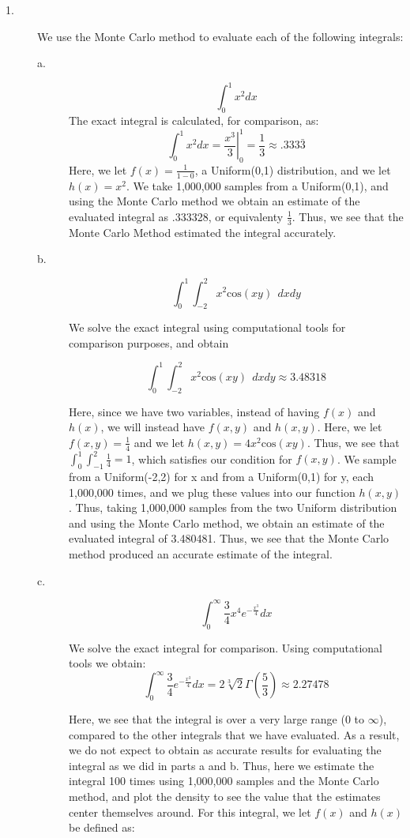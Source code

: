 \documentclass[12pt]{article}
\renewcommand{\title}[1]{\textbf{#1}\\}
\begin{document}
\center{\title{STAT 243 HW\#4}}

\begin{description}


\item[1.] We use the Monte Carlo method to evaluate each of the following integrals:
\begin{description}
\item[a.] \[\int_0^1 x^2 dx\]
The exact integral is calculated, for comparison, as:
\[\int_0^1 x^2 dx = \left. \frac{x^3}{3} \right|_0^1 = \frac{1}{3} \approx .333\bar{3} \]
Here, we let $f(x) = \frac{1}{1-0}$, a Uniform(0,1) distribution, and we let $h(x) = x^2$. We take 1,000,000 samples from a Uniform(0,1), and using the Monte Carlo method we obtain an estimate of the evaluated integral as .333328, or equivalenty $\frac{1}{3}$. Thus, we see that the Monte Carlo Method estimated the integral accurately. 

\item[b.] \[\int_0^1 \int^2_{-2} x^2 \mathrm{cos}(xy) \ \ dx dy\]

We solve the exact integral using computational tools for comparison purposes, and obtain

\[\int_0^1 \int^2_{-2} x^2 \mathrm{cos}(xy) \ \ dx dy \approx 3.48318\]

Here, since we have two variables, instead of having $f(x)$ and $h(x)$, we will instead have $f(x,y)$ and $h(x,y)$. Here, we let $f(x,y) = \frac{1}{4}$ and we let $h(x,y) = 4x^2\mathrm{cos}(xy)$. Thus, we see that $\int_0^1 \int_{-1}^2 \frac{1}{4} = 1$, which satisfies our condition for $f(x,y)$. We sample from a Uniform(-2,2) for x and from a Uniform(0,1) for y, each 1,000,000 times, and we plug these values into our function $h(x,y)$. Thus, taking 1,000,000 samples from the two Uniform distribution and using the Monte Carlo method, we obtain an estimate of the evaluated integral of 3.480481. Thus, we see that the Monte Carlo method produced an accurate estimate of the integral. 

\item[c.] \[\int_0^\infty \frac{3}{4} x^4 e^{-\frac{x^3}{4}} dx\]

We solve the exact integral for comparison. Using computational tools we obtain:
\[\int_0^\infty \frac{3}{4} e^{-\frac{x^3}{4}} dx = 2 \sqrt[3]{2} \Gamma \left( \frac{5}{3} \right) \approx 2.27478 \]

Here, we see that the integral is over a very large range (0 to $\infty$), compared to the other integrals that we have evaluated. As a result, we do not expect to obtain as accurate results for evaluating the integral as we did in parts a and b. Thus, here we estimate the integral 100 times using 1,000,000 samples and the Monte Carlo method, and plot the density to see the value that the estimates center themselves around. For this integral, we let $f(x)$ and $h(x)$ be defined as:


\end{description}
\end{description}
\end{document}
